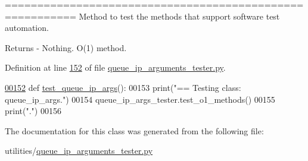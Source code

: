 ========================================================= Method to test the methods that support software test automation. 

\begin{DoxyReturn}{Returns}
-\/ Nothing. O(1) method. 
\end{DoxyReturn}


Definition at line \hyperlink{queue__ip__arguments__tester_8py_source_l00152}{152} of file \hyperlink{queue__ip__arguments__tester_8py_source}{queue\+\_\+ip\+\_\+arguments\+\_\+tester.\+py}.


\begin{DoxyCode}
\hypertarget{classutilities_1_1queue__ip__arguments__tester_1_1queue__ip__args__tester_l00152}{}\hyperlink{classutilities_1_1queue__ip__arguments__tester_1_1queue__ip__args__tester_aee90077323d94238d7f81b23e31207c3}{00152}     \textcolor{keyword}{def }\hyperlink{classutilities_1_1queue__ip__arguments__tester_1_1queue__ip__args__tester_aee90077323d94238d7f81b23e31207c3}{test\_queue\_ip\_args}():
00153         print(\textcolor{stringliteral}{"==   Testing class: queue\_ip\_args."})
00154         queue\_ip\_args\_tester.test\_o1\_methods()
00155         print(\textcolor{stringliteral}{"."})
00156 \end{DoxyCode}


The documentation for this class was generated from the following file\+:\begin{DoxyCompactItemize}
\item 
utilities/\hyperlink{queue__ip__arguments__tester_8py}{queue\+\_\+ip\+\_\+arguments\+\_\+tester.\+py}\end{DoxyCompactItemize}
